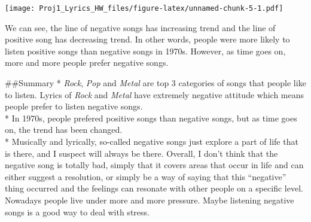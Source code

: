 \documentclass[]{article}
\begin{document}
\texttt{[image: Proj1\_Lyrics\_HW\_files/figure-latex/unnamed-chunk-5-1.pdf]}

We can see, the line of negative songs has increasing trend and the line
of positive song has decreasing trend. In other words, people were more
likely to listen positive songs than negative songs in 1970s. However,
as time goes on, more and more people prefer negative songs.

\#\#Summary * \emph{Rock}, \emph{Pop} and \emph{Metal} are top 3
categories of songs that people like to listen. Lyrics of \emph{Rock}
and \emph{Metal} have extremely negative attitude which means people
prefer to listen negative songs.\\
* In 1970s, people prefered positive songs than negative songs, but as
time goes on, the trend has been changed.\\
* Musically and lyrically, so-called negative songs just explore a part
of life that is there, and I suspect will always be there. Overall, I
don't think that the negative song is totally bad, simply that it covers
areas that occur in life and can either suggest a resolution, or simply
be a way of saying that this ``negative'' thing occurred and the
feelings can resonate with other people on a specific level. Nowadays
people live under more and more pressure. Maybe listening negative songs
is a good way to deal with stress.
\end{document}
